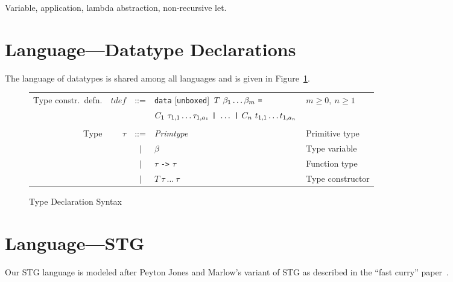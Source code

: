 \documentclass[11pt]{article}
\begin{document}
Variable, application, lambda abstraction, non-recursive let.

\section{Language---Datatype Declarations}

The language of datatypes is shared among all languages and is given in Figure~\ref{fig:typedecsyntax}.

\setlength{\tabcolsep}{5pt}
\begin{figure}[t]
\centering
\footnotesize %
\begin{tabular}{r r c l l}
  Type constr.\ defn. &  $\mathit{tdef}$ & ::= & \texttt{data} [\texttt{unboxed}]\ 
  $T\ \beta_1 \dots \beta_m\ \mbox{\texttt{=}} $ & $m \ge 0,\ n \ge 1$\\
  & & & \quad $C_1\ \tau_{1,1} \dots \tau_{1,a_1}\ \mbox{\texttt{|}}\ \dots\ \mbox{\texttt{|}}\ C_n\ t_{1,1} \dots t_{1,a_n}  $ \\
\\
Type               & $\tau$           & ::= & \emph{Primtype}           & Primitive type\\
                   &                  & $|$ & $\beta$                   & Type variable \\
                   &                  & $|$ & $\tau$ \texttt{->} $\tau$ & Function type \\
                   &                  & $|$ & $T\ \tau\ \dots\ \tau$    & Type constructor\\
\end{tabular}
\caption{Type Declaration Syntax}
\label{fig:typedecsyntax}
\end{figure}

\section{Language---STG}

Our STG language is modeled after Peyton Jones and Marlow's variant of STG as described in the ``fast curry''
paper~\cite{PJM??}.
\end{document}
